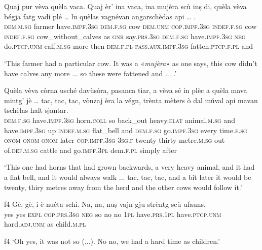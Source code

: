 \begin{linenumbers}
	\gll Quaj pur vèva quèla vaca. Quaj èr’ ina vaca, ina mujèra\footnotemark{} scù inṣ di, quèla vèva bégja fatg vadí plé … lu quèlas vagnévan angarschèdas api … .   \\
	\textsc{dem.m.sg} farmer have.\textsc{impf.3sg} \textsc{dem.f.sg} cow \textsc{dem.unm} \textsc{cop.impf.3sg} \textsc{indef.f.sg} cow \textsc{indef.f.sg} cow\_without\_calves as \textsc{gnr} say.\textsc{prs.3sg} \textsc{dem.f.sg} have.\textsc{impf.3sg} \textsc{neg} do.\textsc{ptcp.unm} calf.\textsc{m.sg} more {} then \textsc{dem.f.pl} \textsc{pass.aux.impf.3sg} fatten.\textsc{ptcp.f.pl} and \\
\end{linenumbers}
\medskip
\glt `This farmer had a particular cow. It was a «\textit{mujèra}» as one says, this cow didn't have calves any more ... so these were fattened and ... .'
\medskip

\begin{linenumbers}
	\gll  Quèla vèva còrna usché davùsòra, pasanca tiar, a vèva sé in plèc\footnotemark{} a quèla mava mintg’ jè … tac, tac, tac, vònzaj èra la végn, trènta mèters ò dal  múval api mavan tschèlas halt sjantar.  \\
	\textsc{dem.f.sg} have.\textsc{impf.3sg} horn.\textsc{coll} so back\_out heavy.\textsc{elat} animal.\textsc{m.sg} and have.\textsc{impf.3sg} up \textsc{indef.m.sg} flat\_bell and \textsc{dem.f.sg} go.\textsc{impf.3sg} every time.\textsc{f.sg} {} \textsc{onom} \textsc{onom} \textsc{onom} later \textsc{cop.impf.3sg} \textsc{3sg.f} twenty thirty metre.\textsc{m.sg} out of.\textsc{def.m.sg} cattle and go.\textsc{impf.3pl} dem.\textsc{f.pl} simply after\\
\end{linenumbers}
\medskip
\glt `This one had horns that had grown backwards, a very heavy animal, and it had a flat bell, and it would always walk ... tac, tac, tac, and a bit later it would be twenty, thiry metres away from the herd and the other cows would follow it.'
\medskip

\begin{linenumbers}
	\gll  {\ob}f4{\cb} Gè, gè, i è nuéta schi. Na, na, nuṣ vajn gju strèntg scù ufauns.  \\
{} yes yes \textsc{expl} \textsc{cop.prs.3sg} \textsc{neg} so no no \textsc{1pl} have.\textsc{prs.1pl} have.\textsc{ptcp.unm} hard.\textsc{adj.unm} as child.\textsc{m.pl}	\\
\end{linenumbers}
\medskip
\glt {\ob}f4{\cb} `Oh yes, it was not so (...). No no, we had a hard time as children.'
\medskip

